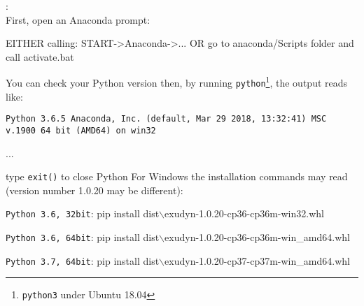 \noindent {}:\vspace{6pt}\\
First, open an Anaconda prompt:
\bi
  \item EITHER calling: START->Anaconda->... OR go to anaconda/Scripts folder and call activate.bat
  \item You can check your Python version then, by running \texttt{python}\footnote{\texttt{python3} under Ubuntu 18.04}, the output reads like:
  \bi
    \item[] \texttt{Python 3.6.5 \textbar Anaconda, Inc.\textbar\ (default, Mar 29 2018, 13:32:41) \lbrack MSC v.1900 64 bit (AMD64)\rbrack\ on win32}
    \item[] ...
  \ei
  \item type \texttt{exit()} to close Python
\ei
%
%
For Windows the installation commands may read (version number 1.0.20 may be different):
\bi
  \item \texttt{Python 3.6, 32bit}: pip install dist$\backslash$exudyn-1.0.20-cp36-cp36m-win32.whl
  \item \texttt{Python 3.6, 64bit}: pip install dist$\backslash$exudyn-1.0.20-cp36-cp36m-win\_amd64.whl
  \item \texttt{Python 3.7, 64bit}: pip install dist$\backslash$exudyn-1.0.20-cp37-cp37m-win\_amd64.whl
\ei

%


